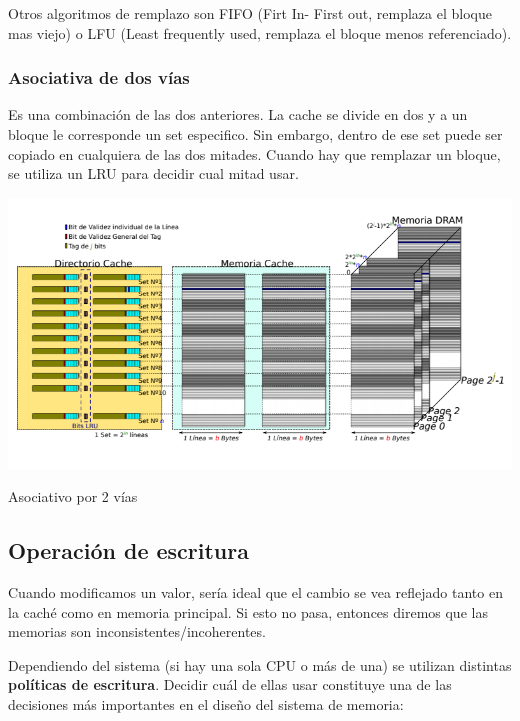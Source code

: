 Otros algoritmos de remplazo son FIFO (Firt In- First out, remplaza el bloque mas viejo) o LFU (Least frequently used, remplaza el bloque menos referenciado).

\subsubsection{Asociativa de dos vías}

Es una combinación de las dos anteriores. La cache se divide en dos y a un bloque le corresponde un set especifico. Sin embargo, dentro de ese set puede ser copiado en cualquiera de las dos mitades. Cuando hay que remplazar un bloque, se utiliza un LRU para decidir cual mitad usar.

\begin{minipage}{\textwidth}
	\centering
		\includegraphics[width=\textwidth]{imagenes/cache-asociativo-vias}
	
	Asociativo por 2 vías
	\label{fig:asociativo-mapping}
\end{minipage}

\subsection{Operación de escritura}

Cuando modificamos un valor, sería ideal que el cambio se vea reflejado tanto en la caché como en memoria principal. Si esto no pasa, entonces diremos que las memorias son inconsistentes/incoherentes.

Dependiendo del sistema (si hay una sola CPU o más de una) se utilizan distintas \textbf{políticas de escritura}. Decidir cuál de ellas usar constituye una de las decisiones más importantes en el diseño del sistema de memoria:

